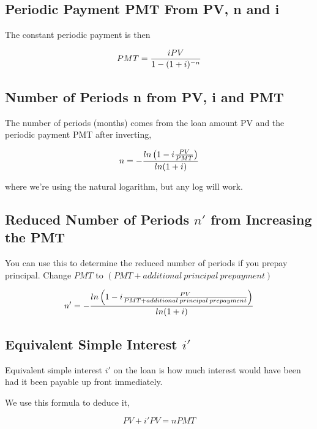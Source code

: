 \documentclass{article}
\theoremstyle{definition} %
\theoremstyle{definition} %
\theoremstyle{remark} %
\begin{document}
\subsection{Periodic Payment PMT From PV, n and i}

The constant periodic payment is then

\begin{equation}
PMT =  {i PV \over  1-(1+i)^{-n}} 
\end{equation}

\subsection{Number of Periods n from PV, i and PMT}

The number of periods (months) comes from the loan amount PV and the periodic payment PMT after inverting,

\begin{equation}
n = -{ ln \left(     {1 - i {PV \over PMT}}    \right) \over { ln( 1 + i ) } }
\end{equation}

where we're using the natural logarithm, but any log will work.

\subsection{Reduced Number of Periods $n'$ from Increasing the PMT}

You can use this to determine the reduced number of periods if you prepay principal.  Change $PMT$ to $(PMT + additional\:  principal \: prepayment)$

\begin{equation}
n' = -{ ln \left(     {1 - i {PV \over {PMT + additional\:  principal \: prepayment}}}       \right) \over { ln( 1 + i ) } }
\end{equation}

\subsection{Equivalent Simple Interest $i'$}

Equivalent simple interest $i'$ on the loan is how much interest would have been had it been payable up front immediately.

We use this formula to deduce it,

\begin{equation}
PV + i' PV = n PMT
\end{equation}
\end{document}

